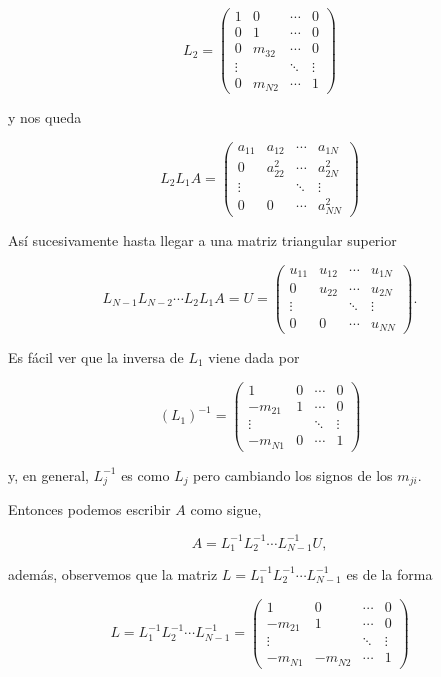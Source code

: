 \documentclass[10pt]{article}
\begin{document}
$$
L_{2}=\left(\begin{array}{cccc}
1 & 0 & \cdots & 0 \\
0 & 1 & \cdots & 0 \\
0 & m_{32} & \cdots & 0 \\
\vdots & & \ddots & \vdots \\
0 & m_{N 2} & \cdots & 1
\end{array}\right)
$$

y nos queda

$$
L_{2} L_{1} A=\left(\begin{array}{cccc}
a_{11} & a_{12} & \cdots & a_{1 N} \\
0 & a_{22}^{2} & \cdots & a_{2 N}^{2} \\
\vdots & & \ddots & \vdots \\
0 & 0 & \cdots & a_{N N}^{2}
\end{array}\right)
$$

Así sucesivamente hasta llegar a una matriz triangular superior

$$
L_{N-1} L_{N-2} \cdots L_{2} L_{1} A=U=\left(\begin{array}{cccc}
u_{11} & u_{12} & \cdots & u_{1 N} \\
0 & u_{22} & \cdots & u_{2 N} \\
\vdots & & \ddots & \vdots \\
0 & 0 & \cdots & u_{N N}
\end{array}\right) .
$$

Es fácil ver que la inversa de $L_{1}$ viene dada por

$$
\left(L_{1}\right)^{-1}=\left(\begin{array}{cccc}
1 & 0 & \cdots & 0 \\
-m_{21} & 1 & \cdots & 0 \\
\vdots & & \ddots & \vdots \\
-m_{N 1} & 0 & \cdots & 1
\end{array}\right)
$$

y, en general, $L_{j}^{-1}$ es como $L_{j}$ pero cambiando los signos de los $m_{j i}$.

Entonces podemos escribir $A$ como sigue,

$$
A=L_{1}^{-1} L_{2}^{-1} \cdots L_{N-1}^{-1} U,
$$

además, observemos que la matriz $L=L_{1}^{-1} L_{2}^{-1} \cdots L_{N-1}^{-1}$ es de la forma

$$
L=L_{1}^{-1} L_{2}^{-1} \cdots L_{N-1}^{-1}=\left(\begin{array}{cccc}
1 & 0 & \cdots & 0 \\
-m_{21} & 1 & \cdots & 0 \\
\vdots & & \ddots & \vdots \\
-m_{N 1} & -m_{N 2} & \cdots & 1
\end{array}\right)
$$
\end{document}
